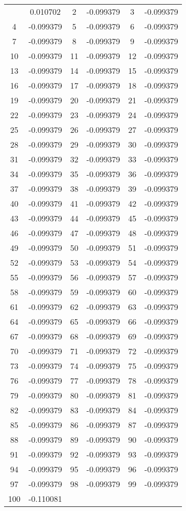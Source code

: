 \documentclass[12pt]{article}
\begin{document}
\begin{longtable}{@{}cc|cc|cc@{}}
\bottomrule
\endlastfoot
1 & 0.010702 & 2 & -0.099379 & 3 & -0.099379 \\
4 & -0.099379 & 5 & -0.099379 & 6 & -0.099379 \\
7 & -0.099379 & 8 & -0.099379 & 9 & -0.099379 \\
10 & -0.099379 & 11 & -0.099379 & 12 & -0.099379 \\
13 & -0.099379 & 14 & -0.099379 & 15 & -0.099379 \\
16 & -0.099379 & 17 & -0.099379 & 18 & -0.099379 \\
19 & -0.099379 & 20 & -0.099379 & 21 & -0.099379 \\
22 & -0.099379 & 23 & -0.099379 & 24 & -0.099379 \\
25 & -0.099379 & 26 & -0.099379 & 27 & -0.099379 \\
28 & -0.099379 & 29 & -0.099379 & 30 & -0.099379 \\
31 & -0.099379 & 32 & -0.099379 & 33 & -0.099379 \\
34 & -0.099379 & 35 & -0.099379 & 36 & -0.099379 \\
37 & -0.099379 & 38 & -0.099379 & 39 & -0.099379 \\
40 & -0.099379 & 41 & -0.099379 & 42 & -0.099379 \\
43 & -0.099379 & 44 & -0.099379 & 45 & -0.099379 \\
46 & -0.099379 & 47 & -0.099379 & 48 & -0.099379 \\
49 & -0.099379 & 50 & -0.099379 & 51 & -0.099379 \\
52 & -0.099379 & 53 & -0.099379 & 54 & -0.099379 \\
55 & -0.099379 & 56 & -0.099379 & 57 & -0.099379 \\
58 & -0.099379 & 59 & -0.099379 & 60 & -0.099379 \\
61 & -0.099379 & 62 & -0.099379 & 63 & -0.099379 \\
64 & -0.099379 & 65 & -0.099379 & 66 & -0.099379 \\
67 & -0.099379 & 68 & -0.099379 & 69 & -0.099379 \\
70 & -0.099379 & 71 & -0.099379 & 72 & -0.099379 \\
73 & -0.099379 & 74 & -0.099379 & 75 & -0.099379 \\
76 & -0.099379 & 77 & -0.099379 & 78 & -0.099379 \\
79 & -0.099379 & 80 & -0.099379 & 81 & -0.099379 \\
82 & -0.099379 & 83 & -0.099379 & 84 & -0.099379 \\
85 & -0.099379 & 86 & -0.099379 & 87 & -0.099379 \\
88 & -0.099379 & 89 & -0.099379 & 90 & -0.099379 \\
91 & -0.099379 & 92 & -0.099379 & 93 & -0.099379 \\
94 & -0.099379 & 95 & -0.099379 & 96 & -0.099379 \\
97 & -0.099379 & 98 & -0.099379 & 99 & -0.099379 \\
100 & -0.110081 &  &  &  &  \\

\end{longtable}
\end{document}

